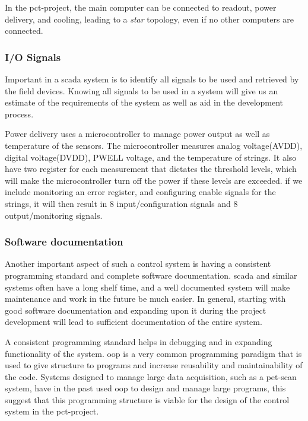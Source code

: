 \documentclass[main.tex]{subfiles}
\begin{document}
In the \gls{pct}-project, the main computer can be connected to readout, power delivery, and cooling, leading to a \textit{star} topology, even if no other computers are connected.

\subsubsection{I/O Signals}

Important in a \gls{scada} system is to identify all signals to be used and retrieved by the field devices. Knowing all signals to be used in a system will give us an estimate of the requirements of the system as well as aid in the development process.

Power delivery uses a microcontroller to manage power output as well as temperature of the sensors. The microcontroller measures analog voltage(AVDD), digital voltage(DVDD), PWELL voltage, and the temperature of strings. It also have two register for each measurement that dictates the threshold levels, which will make the microcontroller turn off the power if these levels are exceeded. if we include monitoring an error register, and configuring enable signals for the strings, it will then result in 8 input/configuration signals and 8 output/monitoring signals.


\subsubsection{Software documentation}
Another important aspect of such a control system is having a consistent programming standard and complete software documentation. \gls{scada} and similar systems often have a long shelf time, and a well documented system will make maintenance and work in the future be much easier. In general, starting with good software documentation and expanding upon it during the project development will lead to sufficient documentation of the entire system.

A consistent programming standard helps in debugging and in expanding functionality of the system. \gls{oop} is a very common programming paradigm that is used to give structure to programs and increase reusability and maintainability of the code. Systems designed to manage large data acquisition, such as a \gls{pet}-scan system, have in the past used \gls{oop} to design and manage large programs\cite{pet_control_system}, this suggest that this programming structure is viable for the design of the control system in the \gls{pct}-project.
\end{document}
